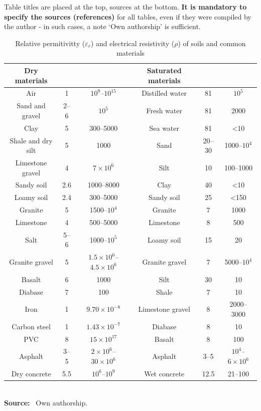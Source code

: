 	Table titles are placed at the top, sources at the bottom. \textbf{It is mandatory to specify the sources (references)} for all tables, even if they were compiled by the author - in such cases, a note `Own authorship' is sufficient.
		\begin{table}[H]
		\renewcommand{\arraystretch}{1.3}
		\caption{Relative permitivitty ($\varepsilon_r$) and electrical resistivity ($\rho$) of soils and common materials }
		\label{table:soil_properties}
		\centering
		\begin{tabular}{|c|c|c|c|c|c|}
			\hline
			\textbf{Dry materials} & \boldmath{$\varepsilon_r$} & \boldmath{$\rho$ [$\Omega$.m]} & 
			\textbf{Saturated materials} &
			\boldmath{$\varepsilon_r$} &
			\boldmath{$\rho$ [$\Omega$.m]} \\
			\hline
			Air & 1 & $10^9$--$10^{15}$ & Distilled water & 81 & $10^5$ \\ \hline
			Sand and gravel & 2--6 & $10^5$ & Fresh water & 81 & 2000 \\ \hline
			Clay & 5 & 300--5000 & Sea water & 81 & <10 \\ \hline
			Shale and dry silt & 5 & 1000 & Sand & 20--30 & 1000--$10^4$ \\ \hline
			Limestone gravel & 4 & $7\times10^6$ & Silt & 10 & 100--1000 \\ \hline
			Sandy soil & 2.6 & 1000--8000 & Clay & 40 & <10 \\ \hline
			Loamy soil & 2.4 & 300--5000 & Sandy soil & 25 & <150 \\ \hline
			Granite & 5 & 1500--$10^4$ & Granite & 7 & 1000 \\ \hline
			Limestone & 4 & 500--5000 & Limestone & 8 & 500 \\ \hline
			Salt & 5--6 & 1000--$10^5$ & Loamy soil & 15 & 20 \\ \hline
			Granite gravel & 5 & $1.5\times10^6$--$4.5\times10^{6}$ & Granite gravel & 7 & 5000--$10^4$ \\ \hline
			Basalt & 6 & 1000 & Silt & 30 & 10 \\ \hline
			Diabase & 7 & 100 & Shale & 7 & 10 \\ \hline
			Iron & 1 & $9.70\times10^{-8}$ & Limestone gravel & 8 & 2000--3000 \\ \hline
			Carbon steel & 1 & $1.43\times10^{-7}$ & Diabase & 8 & 10 \\ \hline 
			PVC & 8 & $15\times10^{17}$ & Basalt & 8 & 100 \\ \hline
			Asphalt & 3--5 & $2\times10^{6}$--$30\times10^{6}$ & Asphalt & 3--5 & $10^4$--$6\times10^{6}$ \\ \hline
			Dry concrete & 5.5 & $10^6$--$10^{9}$ & Wet concrete & 12.5 & 21--100 \\
			\hline
		\end{tabular}
		\vspace{0.05cm}\\
		\textbf{Source:} ~Own authorship.\\
	\end{table}
	
